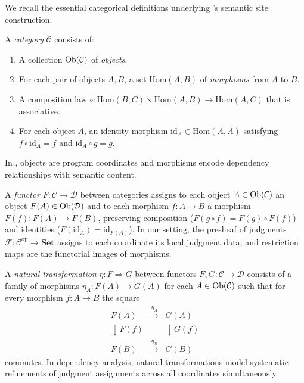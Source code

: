 \documentclass[11pt]{article}
\begin{document}
We recall the essential categorical definitions underlying \JuGeo's semantic
site construction.

\begin{definition}[Category]\label{def:category}
A \emph{category} $\mathcal{C}$ consists of:
\begin{enumerate}[noitemsep]
  \item A collection $\mathrm{Ob}(\mathcal{C})$ of \emph{objects}.
  \item For each pair of objects $A, B$, a set $\mathrm{Hom}(A, B)$ of
        \emph{morphisms} from $A$ to $B$.
  \item A composition law $\circ : \mathrm{Hom}(B, C) \times
        \mathrm{Hom}(A, B) \to \mathrm{Hom}(A, C)$ that is associative.
  \item For each object $A$, an identity morphism
        $\mathrm{id}_A \in \mathrm{Hom}(A, A)$ satisfying
        $f \circ \mathrm{id}_A = f$ and $\mathrm{id}_A \circ g = g$.
\end{enumerate}
In \JuGeo, objects are program coordinates and morphisms encode dependency
relationships with semantic content.
\end{definition}

\begin{definition}[Functor]\label{def:functor}
A \emph{functor} $F : \mathcal{C} \to \mathcal{D}$ between categories
assigns to each object $A \in \mathrm{Ob}(\mathcal{C})$ an object
$F(A) \in \mathrm{Ob}(\mathcal{D})$ and to each morphism $f : A \to B$ a morphism
$F(f) : F(A) \to F(B)$, preserving composition ($F(g \circ f) = F(g) \circ F(f)$)
and identities ($F(\mathrm{id}_A) = \mathrm{id}_{F(A)}$).
In our setting, the presheaf of judgments $\mathcal{F} : \mathcal{C}^{\mathrm{op}} \to \mathbf{Set}$
assigns to each coordinate its local judgment data, and restriction maps
are the functorial images of morphisms.
\end{definition}

\begin{definition}\label{def:nat-trans}
A \emph{natural transformation} $\eta : F \Rightarrow G$ between functors
$F, G : \mathcal{C} \to \mathcal{D}$ consists of a family of morphisms
$\eta_A : F(A) \to G(A)$ for each $A \in \mathrm{Ob}(\mathcal{C})$ such that for
every morphism $f : A \to B$ the square
\[
  \begin{array}{ccc}
  F(A) & \xrightarrow{\eta_A} & G(A) \\
  \downarrow\scriptstyle{F(f)} & & \downarrow\scriptstyle{G(f)} \\
  F(B) & \xrightarrow{\eta_B} & G(B)
  \end{array}
\]
commutes.  In dependency analysis, natural transformations model systematic
refinements of judgment assignments across all coordinates simultaneously.
\end{definition}
\end{document}

